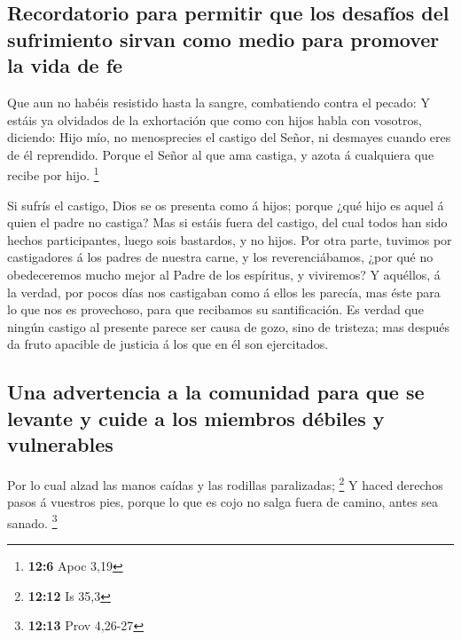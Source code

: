 \hypertarget{recordatorio-para-permitir-que-los-desafuxedos-del-sufrimiento-sirvan-como-medio-para-promover-la-vida-de-fe}{%
\subsection{Recordatorio para permitir que los desafíos del sufrimiento
sirvan como medio para promover la vida de
fe}\label{recordatorio-para-permitir-que-los-desafuxedos-del-sufrimiento-sirvan-como-medio-para-promover-la-vida-de-fe}}

 Que aun no habéis resistido hasta la sangre, combatiendo
contra el pecado:  Y estáis ya olvidados de la exhortación
que como con hijos habla con vosotros, diciendo: Hijo mío, no
menosprecies el castigo del Señor, ni desmayes cuando eres de él
reprendido.  Porque el Señor al que ama castiga, y azota á
cualquiera que recibe por hijo. \footnote{\textbf{12:6} Apoc 3,19}

 Si sufrís el castigo, Dios se os presenta como á hijos;
porque ¿qué hijo es aquel á quien el padre no castiga?  Mas
si estáis fuera del castigo, del cual todos han sido hechos
participantes, luego sois bastardos, y no hijos.  Por otra
parte, tuvimos por castigadores á los padres de nuestra carne, y los
reverenciábamos, ¿por qué no obedeceremos mucho mejor al Padre de los
espíritus, y viviremos?  Y aquéllos, á la verdad, por pocos
días nos castigaban como á ellos les parecía, mas éste para lo que nos
es provechoso, para que recibamos su santificación.  Es
verdad que ningún castigo al presente parece ser causa de gozo, sino de
tristeza; mas después da fruto apacible de justicia á los que en él son
ejercitados.

\hypertarget{una-advertencia-a-la-comunidad-para-que-se-levante-y-cuide-a-los-miembros-duxe9biles-y-vulnerables}{%
\subsection{Una advertencia a la comunidad para que se levante y cuide a
los miembros débiles y
vulnerables}\label{una-advertencia-a-la-comunidad-para-que-se-levante-y-cuide-a-los-miembros-duxe9biles-y-vulnerables}}

 Por lo cual alzad las manos caídas y las rodillas
paralizadas; \footnote{\textbf{12:12} Is 35,3}  Y haced
derechos pasos á vuestros pies, porque lo que es cojo no salga fuera de
camino, antes sea sanado. \footnote{\textbf{12:13} Prov 4,26-27}

